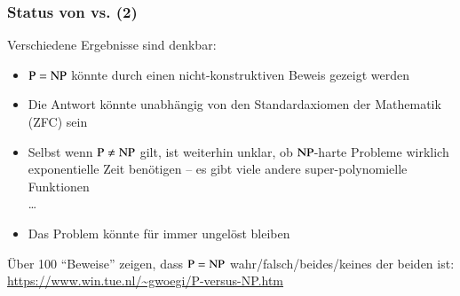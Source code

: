 \documentclass[aspectratio=1610,onlymath]{beamer}
\begin{document}
\begin{frame}\frametitle{Status von  vs.  (2)}

  Verschiedene Ergebnisse sind denkbar:\pause
  \begin{itemize}
	\item ${\textsc{P}} =  {\textsc{NP}}$ könnte durch einen nicht-konstruktiven Beweis gezeigt werden\pause
	\item Die Antwort könnte unabhängig von den Standardaxiomen der Mathematik (ZFC) sein\pause
	\item Selbst wenn ${\textsc{P}} \neq {\textsc{NP}}$ gilt, ist weiterhin unklar, ob ${\textsc{NP}}$-harte Probleme wirklich exponentielle Zeit benötigen -- es gibt viele andere super-polynomielle Funktionen\\\ldots\pause
	\item Das Problem könnte für immer ungelöst bleiben\pause
  \end{itemize}\bigskip
  
  Über 100 "`Beweise"' zeigen, dass ${\textsc{P}} = {\textsc{NP}}$ wahr/falsch/beides/keines der beiden ist: \url{https://www.win.tue.nl/~gwoegi/P-versus-NP.htm}
   
\end{frame}

% 
%    
\end{document}
